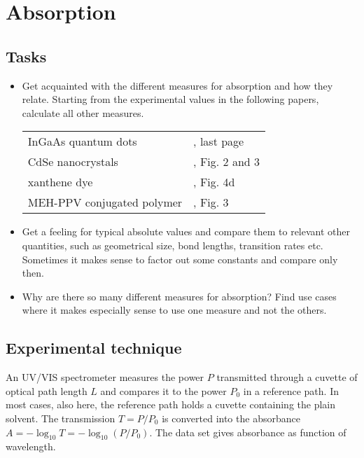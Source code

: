 \renewcommand{\lastmod}{April 29, 2020}

\chapter{Absorption}




\section{Tasks}

\begin{itemize}
\item Get acquainted with the different measures for absorption and how they relate. Starting from the experimental values in the following papers, calculate all other measures.

\begin{tabular}{ll}
InGaAs quantum dots & \cite{Borri:2002p139}, last page  \\
CdSe nanocrystals & \cite{Jasieniak:2009er}, Fig. 2 and 3  \\
xanthene dye & \cite{Kastrup:2004p1737}, Fig. 4d   \\
MEH-PPV conjugated polymer  & \cite{Hou:2017jm}, Fig. 3 \\
\end{tabular}


\item Get a feeling for typical absolute values and compare them to relevant  other quantities, such as geometrical size, bond lengths, transition rates etc. Sometimes it makes sense to factor out some constants and compare only then.
\item Why are there so many different measures for absorption? Find use cases where it makes especially sense to use one measure and not the others.

\end{itemize}







\section{Experimental technique}

An UV/VIS spectrometer measures the  power $P$ transmitted through a cuvette of optical path length $L$ and compares it to the power $P_0$ in a reference path. In most cases, also here, the reference path holds a cuvette containing  the plain solvent. The transmission $T = P / P_0$ is converted into the absorbance $A = - \log_{10} T = - \log_{10} ( P / P_0)$. The data set gives absorbance as function of wavelength.

